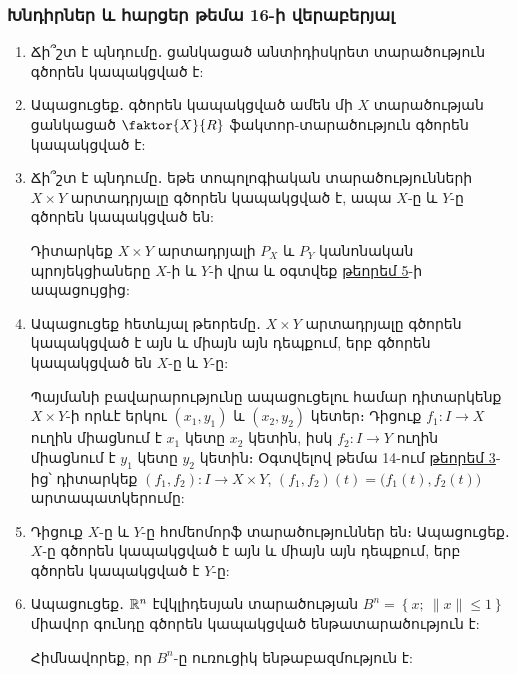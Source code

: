 \bigskip
\bigskip
\subsubsection*{Խնդիրներ և հարցեր թեմա 16-ի վերաբերյալ}

\begin{enumerate}[label=\thesection.\arabic*.]


\item Ճի՞շտ է պնդումը․ ցանկացած անտիդիսկրետ տարածություն գծորեն կապա\-կց\-ված է:

\item Ապացուցեք․ գծորեն կապակցված ամեն մի $X$ տարածության ցանկացած $\faktor{X}{R}$ ֆակտոր-տարածություն գծորեն կապակցված է:

\item Ճի՞շտ է պնդումը․ եթե տոպոլոգիական տարածությունների $X \times Y$ արտադրյալը գծորեն կապակցված է, ապա $X$-ը և $Y$-ը գծորեն կապակցված են:
\begin{hint}
Դիտարկեք $X \times Y$ արտադրյալի $P_X$ և $P_Y$ կանոնական պրո\-յեկ\-ցի\-ա\-ները $X$-ի և $Y$-ի վրա և օգտվեք \hyperref[ch16thm5]{թեորեմ 5}-ի ապացույցից:
\end{hint}

\item Ապացուցեք հետևյալ թեորեմը․ $X \times Y$ արտադրյալը գծորեն կապակցված է այն և միայն այն դեպքում, երբ գծորեն կապակցված են $X$-ը և $Y$-ը:
\begin{hint}
Պայմանի բավարարությունը ապացուցելու համար դիտարկենք $X \times Y$-ի որևէ երկու $(x_1, y_1)$ և $(x_2, y_2)$ կետեր։ Դիցուք $f_1: I \to X$ ուղին մի\-աց\-նում է $x_1$ կետը $x_2$ կետին, իսկ $f_2: I \to Y$ ուղին միացնում է $y_1$ կետը $y_2$ կետին։ Օգտվելով թեմա 14-ում \hyperref[ch14thm3]{թեորեմ 3}-ից՝ դիտարկեք $(f_1, f_2): I \to X \times Y$, $(f_1, f_2)(t) = \big(f_1(t), f_2(t)\big)$ արտապատկերումը:
\end{hint}

\item Դիցուք $X$-ը և $Y$-ը հոմեոմորֆ տարածություններ են։ Ապացուցեք․ $X$-ը գծո\-րեն կապակցված է այն և միայն այն դեպքում, երբ գծորեն կապակցված է $Y$-ը:

\item Ապացուցեք․ $\mathbb{R}^n$ էվկլիդեսյան տարածության $B^n = \left\{x;\ \|x\| \le 1\right\}$ միավոր գուն\-դը գծորեն կապակցված ենթատարածություն է:
\begin{hint}
Հիմնավորեք, որ $B^n$-ը ուռուցիկ ենթաբազմություն է:
\end{hint}


\end{enumerate}

